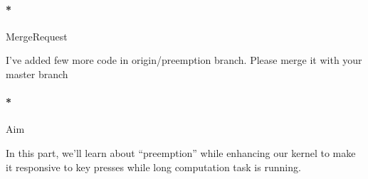 \documentclass[]{article}
\newenvironment{Shaded}{}{}
\newcommand{\ExtensionTok}[1]{{#1}}
\newcommand{\NormalTok}[1]{{#1}}
\let\oldparagraph\paragraph
\renewcommand{\paragraph}[1]{\oldparagraph{#1}\mbox{}}
\begin{document}
\paragraph*{MergeRequest}\label{mergerequest-7}

I've added few more code in origin/preemption branch. Please merge it
with your master branch

\begin{Shaded}
\end{Shaded}

\paragraph*{Aim}\label{aim-7}

In this part, we'll learn about ``preemption'' while enhancing our
kernel to make it responsive to key presses while long computation task
is running.
\end{document}
